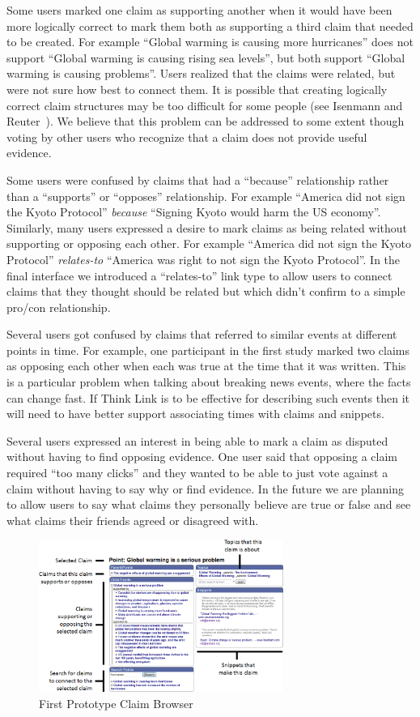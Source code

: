 \documentclass{chi2009}
\begin{document}
Some users marked one claim as supporting another when it would have been more logically correct to mark them both as supporting a third claim that needed to be created. For example ``Global warming is causing more hurricanes'' does not support ``Global warming is causing rising sea levels'', but both support ``Global warming is causing problems''. Users realized that the claims were related, but were not sure how best to connect them. It is possible that creating logically correct claim structures may be too difficult for some people (see Isenmann and Reuter~\cite{Isenmann1997}). We believe that this problem can be addressed to some extent though voting by other users who recognize that a claim does not provide useful evidence. 

Some users were confused by claims that had a ``because'' relationship rather than a ``supports'' or ``opposes'' relationship. For example ``America did not sign the Kyoto Protocol'' {\it because} ``Signing Kyoto would harm the US economy''. Similarly, many users expressed a desire to mark claims as being related without supporting or opposing each other. For example ``America did not sign the Kyoto Protocol'' {\it  relates-to} ``America was right to not sign the Kyoto Protocol''. In the final interface we introduced a ``relates-to'' link type to allow users to connect claims that they thought should be related but which didn't confirm to a simple pro/con relationship. 

Several users got confused by claims that referred to similar events at different points in time. 
For example, one participant in the first study marked two claims as opposing each other when each was true at the time that it was written. This is a particular problem when talking about breaking news events, where the facts can change fast. If Think Link is to be effective for describing such events then it will need to have better support associating times with claims and snippets.

Several users expressed an interest in being able to mark a claim as disputed without having to find opposing evidence. One user said that opposing a claim required ``too many clicks'' and they wanted to be able to just vote against a claim without having to say why or find evidence. In the future we are planning to allow users to say what claims they personally believe are true or false and see what claims their friends agreed or disagreed with.

\begin{figure}[tb]
	\includegraphics[width=8cm]{../screenshots/oldpoint_diagram.png}
	\caption{First Prototype Claim Browser}
	\label{oldbrowser}
\end{figure}
\end{document}
